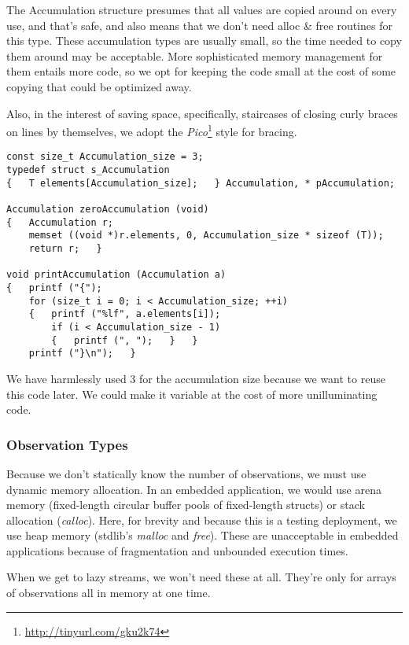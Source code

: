 \documentclass[10pt,oneside,x11names]{article}
\begin{document}
The Accumulation structure presumes that all values are copied around on every
use, and that's safe, and also means that we don't need alloc \& free routines
for this type. These accumulation types are usually small, so the time needed to
copy them around may be acceptable. More sophisticated memory management for
them entails more code, so we opt for keeping the code small at the cost of some
copying that could be optimized away.

Also, in the interest of saving space, specifically, staircases of closing curly
braces on lines by themselves, we adopt the \emph{Pico}\footnote{\url{http://tinyurl.com/gku2k74}} style for bracing.

\begin{verbatim}
const size_t Accumulation_size = 3;
typedef struct s_Accumulation
{   T elements[Accumulation_size];   } Accumulation, * pAccumulation;

Accumulation zeroAccumulation (void)
{   Accumulation r;
    memset ((void *)r.elements, 0, Accumulation_size * sizeof (T));
    return r;   }

void printAccumulation (Accumulation a)
{   printf ("{");
    for (size_t i = 0; i < Accumulation_size; ++i)
    {   printf ("%lf", a.elements[i]);
        if (i < Accumulation_size - 1)
        {   printf (", ");   }   }
    printf ("}\n");   }
\end{verbatim}

We have harmlessly used \(3\) for the accumulation size because we want to reuse
this code later. We could make it variable at the cost of more unilluminating
code.

\subsubsection{Observation Types}
\label{sec:orgheadline7}

Because we don't statically know the number of observations, we must use
dynamic memory allocation. In an embedded application, we would use arena memory
(fixed-length circular buffer pools of fixed-length structs) or stack allocation
(\emph{calloc}). Here, for brevity and because this is a testing deployment, we use
heap memory (stdlib's \emph{malloc} and \emph{free}). These are unacceptable in embedded
applications because of fragmentation and unbounded execution times.

When we get to lazy streams, we won't need these at all. They're only for arrays
of observations all in memory at one time.
\end{document}
